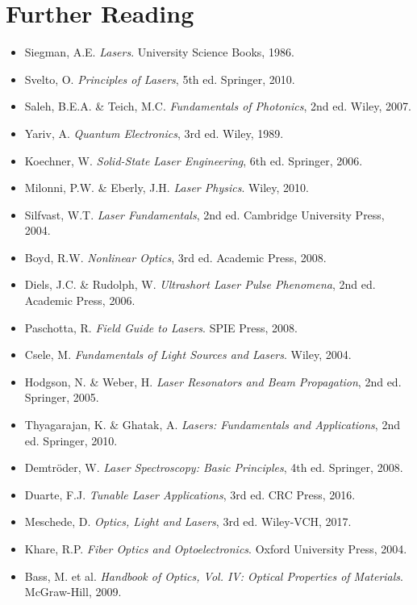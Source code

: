 \documentclass[a4paper, 11pt]{article}
\begin{document}
\section*{Further Reading}

\begin{itemize}
\item Siegman, A.E. \textit{Lasers}. University Science Books, 1986.
\item Svelto, O. \textit{Principles of Lasers}, 5th ed. Springer, 2010.
\item Saleh, B.E.A. \& Teich, M.C. \textit{Fundamentals of Photonics}, 2nd ed. Wiley, 2007.
\item Yariv, A. \textit{Quantum Electronics}, 3rd ed. Wiley, 1989.
\item Koechner, W. \textit{Solid-State Laser Engineering}, 6th ed. Springer, 2006.
\item Milonni, P.W. \& Eberly, J.H. \textit{Laser Physics}. Wiley, 2010.
\item Silfvast, W.T. \textit{Laser Fundamentals}, 2nd ed. Cambridge University Press, 2004.
\item Boyd, R.W. \textit{Nonlinear Optics}, 3rd ed. Academic Press, 2008.
\item Diels, J.C. \& Rudolph, W. \textit{Ultrashort Laser Pulse Phenomena}, 2nd ed. Academic Press, 2006.
\item Paschotta, R. \textit{Field Guide to Lasers}. SPIE Press, 2008.
\item Csele, M. \textit{Fundamentals of Light Sources and Lasers}. Wiley, 2004.
\item Hodgson, N. \& Weber, H. \textit{Laser Resonators and Beam Propagation}, 2nd ed. Springer, 2005.
\item Thyagarajan, K. \& Ghatak, A. \textit{Lasers: Fundamentals and Applications}, 2nd ed. Springer, 2010.
\item Demtröder, W. \textit{Laser Spectroscopy: Basic Principles}, 4th ed. Springer, 2008.
\item Duarte, F.J. \textit{Tunable Laser Applications}, 3rd ed. CRC Press, 2016.
\item Meschede, D. \textit{Optics, Light and Lasers}, 3rd ed. Wiley-VCH, 2017.
\item Khare, R.P. \textit{Fiber Optics and Optoelectronics}. Oxford University Press, 2004.
\item Bass, M. et al. \textit{Handbook of Optics, Vol. IV: Optical Properties of Materials}. McGraw-Hill, 2009.
\end{itemize}
\end{document}

